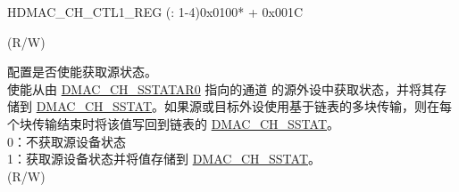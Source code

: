 \begin{register}{H}{DMAC\_CH\_CTL1\_REG (: 1-4)}{0x0100* + 0x001C}
\begin{regdesc}
\begin{reglist}
(R/W)
\label{fielddesc:DMACCHNSRCSTATEN}\item [DMAC\_CH\regindex{n}\_SRC\_STAT\_EN] 配置是否使能获取源状态。\\
使能从由 \hyperref[fielddesc:DMACCHNSSTATAR0]{DMAC\_CH\_SSTATAR0} 指向的通道  的源外设中获取状态，并将其存储到 \hyperref[fielddesc:DMACCHNSSTAT]{DMAC\_CH\_SSTAT}。如果源或目标外设使用基于链表的多块传输，则在每个块传输结束时将该值写回到链表的 \hyperref[fielddesc:DMACCHNSSTAT]{DMAC\_CH\_SSTAT}。\\
0：不获取源设备状态 \\
1：获取源设备状态并将值存储到 \hyperref[fielddesc:DMACCHNSSTAT]{DMAC\_CH\_SSTAT}。\\
(R/W)
\item [见下页...]
\end{reglist}\end{regdesc}
\end{register}

